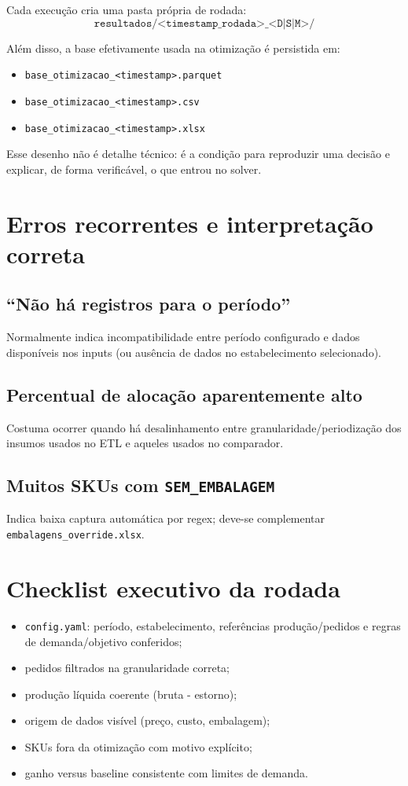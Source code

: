 \documentclass[11pt,a4paper]{article}
\begin{document}
Cada execução cria uma pasta própria de rodada:
\[
\texttt{resultados/<timestamp\_rodada>\_<D|S|M>/}
\]

Além disso, a base efetivamente usada na otimização é persistida em:
\begin{itemize}[leftmargin=1.2cm]
    \item \texttt{base\_otimizacao\_<timestamp>.parquet}
    \item \texttt{base\_otimizacao\_<timestamp>.csv}
    \item \texttt{base\_otimizacao\_<timestamp>.xlsx}
\end{itemize}

Esse desenho não é detalhe técnico: é a condição para reproduzir uma decisão e
explicar, de forma verificável, o que entrou no solver.

\section{Erros recorrentes e interpretação correta}

\subsection*{``Não há registros para o período''}
Normalmente indica incompatibilidade entre período configurado e dados disponíveis
nos inputs (ou ausência de dados no estabelecimento selecionado).

\subsection*{Percentual de alocação aparentemente alto}
Costuma ocorrer quando há desalinhamento entre granularidade/periodização dos
insumos usados no ETL e aqueles usados no comparador.

\subsection*{Muitos SKUs com \texttt{SEM\_EMBALAGEM}}
Indica baixa captura automática por regex; deve-se complementar
\texttt{embalagens\_override.xlsx}.

\section{Checklist executivo da rodada}
\label{sec:checklist-executivo}

\begin{itemize}[leftmargin=1.2cm]
    \item \texttt{config.yaml}: período, estabelecimento, referências produção/pedidos
    e regras de demanda/objetivo conferidos;
    \item pedidos filtrados na granularidade correta;
    \item produção líquida coerente (bruta - estorno);
    \item origem de dados visível (preço, custo, embalagem);
    \item SKUs fora da otimização com motivo explícito;
    \item ganho versus baseline consistente com limites de demanda.
\end{itemize}
\end{document}

